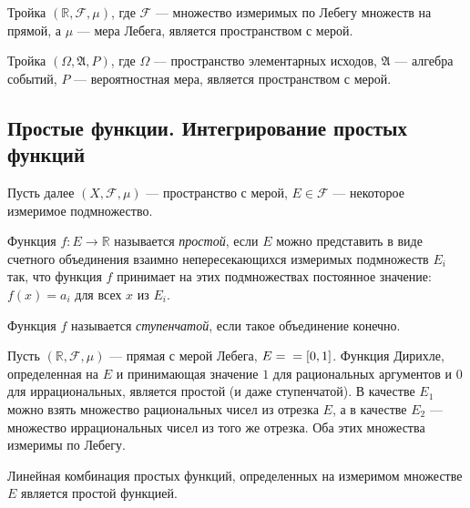 \begin{theorem}
    Тройка $(\mathbb R, \mathcal F, \mu)$, где $\mathcal F$ --- множество
    измеримых по Лебегу множеств на прямой, а $\mu$ --- мера Лебега, является
    пространством с мерой.
\end{theorem}

\begin{example}
    Тройка $(\Omega, \mathfrak A, P)$, где $\Omega$ ---
    пространство элементарных исходов, 
    $\mathfrak A$ --- алгебра событий, $P$ --- вероятностная мера,
    является пространством с мерой.
\end{example}

\subsection[Интегрирование простых функций]{Простые функции. Интегрирование простых функций}

Пусть далее $(X, \mathcal F, \mu)$ --- пространство с мерой, 
$E \in \mathcal F$ --- некоторое измеримое подмножество.

\begin{definition}
    Функция $f \colon E \to \mathbb R$ называется \emph{простой}, если $E$ можно
    представить в виде счетного объединения взаимно непересекающихся измеримых
    подмножеств $E_i$ так, что функция $f$ принимает на этих подмножествах
    постоянное значение: $f(x) = a_i$ для всех $x$ из $E_i$.

    Функция $f$ называется \emph{ступенчатой}, если такое объединение конечно.
\end{definition}

\begin{example}
    Пусть $(\mathbb R, \mathcal F, \mu)$ --- прямая с мерой Лебега, $E = \\ = [0,
    1]$. Функция Дирихле, определенная на $E$ и принимающая значение $1$ 
    для рациональных аргументов и $0$ для иррациональных, является простой (и
    даже ступенчатой).
    В качестве $E_1$ можно взять множество рациональных чисел из отрезка $E$, а
    в качестве $E_2$ --- множество иррациональных чисел из того же отрезка. Оба
    этих множества измеримы по Лебегу.
\end{example}

\begin{lemma}
    Линейная комбинация простых функций, определенных на измеримом множестве $E$
    является простой функцией.
\end{lemma}

